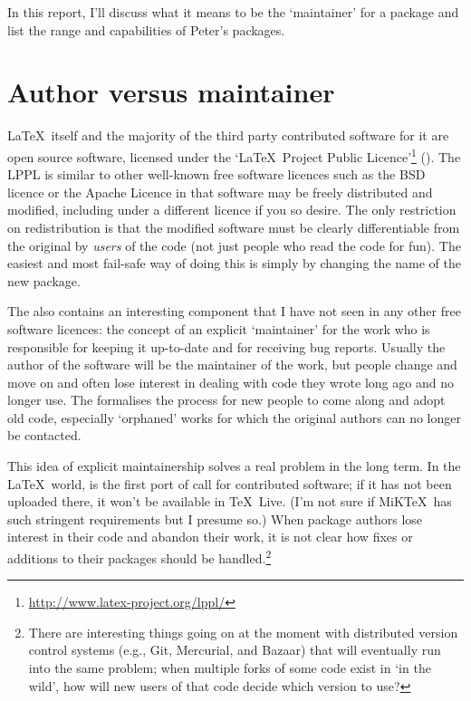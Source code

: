 \documentclass{ltugboat}
\begin{document}
In this report, I'll discuss what it means to be the `maintainer' for a package and list the range and capabilities of Peter's packages.

\section{Author versus maintainer}

\LaTeX\ itself and the majority of the third party contributed software for it are open source software, licensed under the `\LaTeX\ Project Public Licence'\footnote{\url{http://www.latex-project.org/lppl/}} (). The LPPL is similar to other well-known free software licences such as the BSD licence or the Apache Licence in that software may be freely distributed and modified, including under a different licence if you so desire. The only restriction on redistribution is that the modified software must be clearly differentiable from the original by \emph{users} of the code (not just people who read the code for fun). The easiest and most fail-safe way of doing this is simply by changing the name of the new package.

The  also contains an interesting component that I have not seen in any other free software licences: the concept of an explicit `maintainer' for the work who is responsible for keeping it up-to-date and for receiving bug reports. Usually the author of the software will be the maintainer of the work, but people change and move on and often lose interest in dealing with code they wrote long ago and no longer use. The  formalises the process for new people to come along and adopt old code, especially `orphaned' works for which the original authors can no longer be contacted.

This idea of explicit maintainership solves a real problem in the long term. In the \LaTeX\ world,  is the first port of call for contributed software; if it has not been uploaded there, it won't be available in \TeX\ Live. (I'm not sure if MiK\TeX\ has such stringent requirements but I presume so.) When package authors lose interest in their code and abandon their work, it is not clear how fixes or additions to their packages should be handled.\footnote{There are interesting things going on at the moment with distributed version control systems (e.g., Git, Mercurial, and Bazaar) that will eventually run into the same problem; when multiple forks of some code exist in `in the wild', how will new users of that code decide which version to use?}
\end{document}
